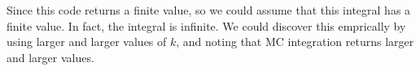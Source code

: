 Since this code returns a finite value, so we could assume that this integral has a finite value.
In fact, the integral is infinite.
We could discover this emprically by using larger and larger values of $k$, and noting that MC integration returns larger and larger values.

